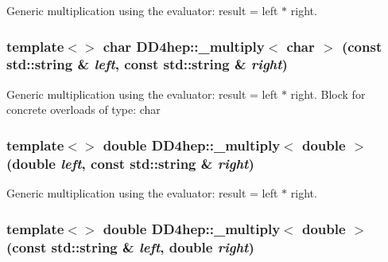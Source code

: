 Generic multiplication using the evaluator: result = left $\ast$ right. \hypertarget{group___d_d4_h_e_p___g_e_o_m_e_t_r_y_gaee0200f19487ef1edebcfbd1f36386fc}{
\subsubsection[{\_\-multiply$<$ char $>$}]{\setlength{\rightskip}{0pt plus 5cm}template$<$$>$ char DD4hep::\_\-multiply$<$ char $>$ (const std::string \& {\em left}, \/  const std::string \& {\em right})}}
\label{group___d_d4_h_e_p___g_e_o_m_e_t_r_y_gaee0200f19487ef1edebcfbd1f36386fc}


Generic multiplication using the evaluator: result = left $\ast$ right. Block for concrete overloads of type: char \hypertarget{group___d_d4_h_e_p___g_e_o_m_e_t_r_y_ga7e18f8eea60e0bad68cccbc5fb890bea}{
\subsubsection[{\_\-multiply$<$ double $>$}]{\setlength{\rightskip}{0pt plus 5cm}template$<$$>$ double DD4hep::\_\-multiply$<$ double $>$ (double {\em left}, \/  const std::string \& {\em right})}}
\label{group___d_d4_h_e_p___g_e_o_m_e_t_r_y_ga7e18f8eea60e0bad68cccbc5fb890bea}


Generic multiplication using the evaluator: result = left $\ast$ right. \hypertarget{group___d_d4_h_e_p___g_e_o_m_e_t_r_y_ga44578801df360dd011986159650ddb4d}{
\subsubsection[{\_\-multiply$<$ double $>$}]{\setlength{\rightskip}{0pt plus 5cm}template$<$$>$ double DD4hep::\_\-multiply$<$ double $>$ (const std::string \& {\em left}, \/  double {\em right})}}
\label{group___d_d4_h_e_p___g_e_o_m_e_t_r_y_ga44578801df360dd011986159650ddb4d}


